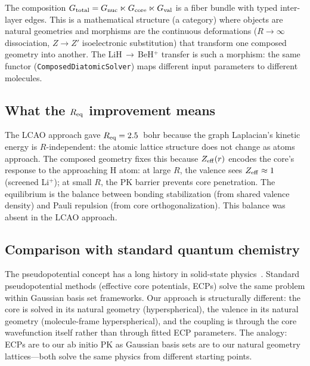 \documentclass[aps,pra,twocolumn,superscriptaddress,longbibliography,floatfix]{revtex4-2}
\begin{document}
The composition $G_{\rm total} = G_{\rm nuc} \ltimes G_{\rm core}
\ltimes G_{\rm val}$ is a fiber bundle with typed inter-layer edges.
This is a mathematical structure (a category) where objects are natural
geometries and morphisms are the continuous deformations
($R \to \infty$ dissociation, $Z \to Z'$ isoelectronic substitution)
that transform one composed geometry into another.  The
LiH$\,{\to}\,$BeH$^+$ transfer is such a morphism: the same functor
(\texttt{ComposedDiatomicSolver}) maps different input parameters to
different molecules.



\subsection{What the $R_{\rm eq}$ improvement means}
\label{sec:req}

The LCAO approach gave $R_{\rm eq} = 2.5$~bohr because the graph
Laplacian's kinetic energy is $R$-independent: the atomic lattice
structure does not change as atoms approach.  The composed geometry
fixes this because $Z_{\rm eff}(r)$ encodes the core's response to the
approaching H atom: at large $R$, the valence sees $Z_{\rm eff} \approx 1$
(screened Li$^+$); at small $R$, the PK barrier prevents core
penetration.  The equilibrium is the balance between bonding
stabilization (from shared valence density) and Pauli repulsion (from
core orthogonalization).  This balance was absent in the LCAO approach.


\subsection{Comparison with standard quantum chemistry}
\label{sec:comparison}

The pseudopotential concept has a long history in solid-state
physics~\cite{heine1970,bachelet1982}.
Standard pseudopotential methods (effective core potentials, ECPs) solve
the same problem within Gaussian basis set frameworks.  Our approach is
structurally different: the core is solved in its natural geometry
(hyperspherical), the valence in its natural geometry (molecule-frame
hyperspherical), and the coupling is through the core wavefunction
itself rather than through fitted ECP parameters.  The analogy:
ECPs are to our ab initio PK as Gaussian basis sets are to our
natural geometry lattices---both solve the same physics from
different starting points.
\end{document}
